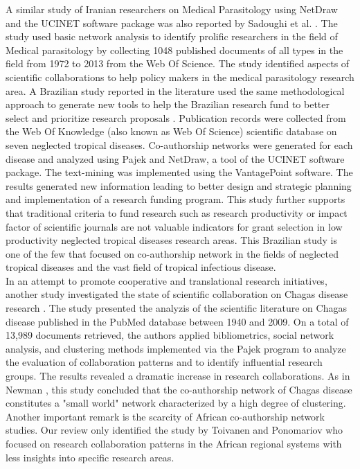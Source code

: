 A similar study of Iranian researchers on Medical Parasitology  using NetDraw and the UCINET software package was also reported by Sadoughi et al. \cite{sadoughi_social_2016}. The study used basic network analysis to identify prolific researchers in the field of Medical parasitology by collecting 1048 published documents of all types in the field from 1972 to 2013 from the Web Of Science. The study identified aspects of scientific collaborations to help policy makers in the medical parasitology research area. A Brazilian study reported in the literature used the same methodological approach to generate new tools to help the Brazilian research fund to better select and prioritize research proposals \cite{morel_co-authorship_2009}. Publication records were collected from the Web Of Knowledge (also known as Web Of Science) scientific database on seven neglected tropical diseases. Co-authorship networks were generated for each disease and analyzed using Pajek and NetDraw, a tool of the UCINET software package. The text-mining was implemented using the VantagePoint software. The results generated new information leading to better design and strategic planning and implementation of a research funding program. This study further supports that traditional criteria to fund research such as research productivity or impact factor of scientific journals are not valuable indicators for grant selection in low productivity neglected tropical diseases research areas. This Brazilian study is one of the few that focused on co-authorship network in the fields of neglected tropical diseases and the vast field of tropical infectious disease. \\
In an attempt to promote cooperative and translational research initiatives, another study investigated the state of scientific collaboration on Chagas disease research \cite{gonzalez-alcaide_scientific_2012}. The study presented the analyzis of the scientific literature on Chagas disease published in the PubMed database between 1940 and 2009. On a total of 13,989 documents retrieved, the authors applied bibliometrics, social network analysis, and clustering methods implemented via the Pajek program to analyze the evaluation of collaboration patterns and to identify influential research groups. The results revealed a dramatic increase in research collaborations. As in Newman \cite{newman_structure_2001}, this study concluded that the co-authorship network of Chagas disease constitutes a "small world" network characterized by a high degree of clustering. Another important remark is the scarcity of African co-authorship network studies. Our review only identified the study by Toivanen and Ponomariov \cite{toivanen_african_2011} who focused on research collaboration patterns in the African regional systems with less insights into specific research areas.\\
